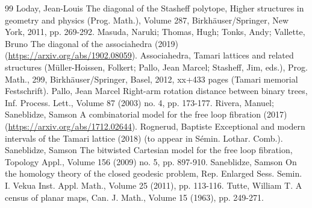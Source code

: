 \documentclass[10pt]{article}
\theoremstyle{definition}
\begin{document}
\begin{thebibliography}{99}
 Loday, Jean-Louis The diagonal of the Stasheff polytope, Higher structures in geometry and physics (Prog. Math.), Volume 287, Birkhäuser/Springer, New York, 2011, pp. 269-292.
 Masuda, Naruki; Thomas, Hugh; Tonks, Andy; Vallette, Bruno The diagonal of the associahedra (2019) (\url{https://arxiv.org/abs/1902.08059}).
 Associahedra, Tamari lattices and related structures (Müller-Hoissen, Folkert; Pallo, Jean Marcel; Stasheff, Jim, eds.), Prog. Math., 299, Birkhäuser/Springer, Basel, 2012, xx+433 pages (Tamari memorial Festschrift).
 Pallo, Jean Marcel Right-arm rotation distance between binary trees, Inf. Process. Lett., Volume 87 (2003) no. 4, pp. 173-177.
 Rivera, Manuel; Saneblidze, Samson A combinatorial model for the free loop fibration (2017) (\url{https://arxiv.org/abs/1712.02644}).
 Rognerud, Baptiste Exceptional and modern intervals of the Tamari lattice (2018) (to appear in Sémin. Lothar. Comb.).
 Saneblidze, Samson The bitwisted Cartesian model for the free loop fibration, Topology Appl., Volume 156 (2009) no. 5, pp. 897-910.
 Saneblidze, Samson On the homology theory of the closed geodesic problem, Rep. Enlarged Sess. Semin. I. Vekua Inst. Appl. Math., Volume 25 (2011), pp. 113-116.
 Tutte, William T. A census of planar maps, Can. J. Math., Volume 15 (1963), pp. 249-271.
\end{thebibliography}
\end{document}
